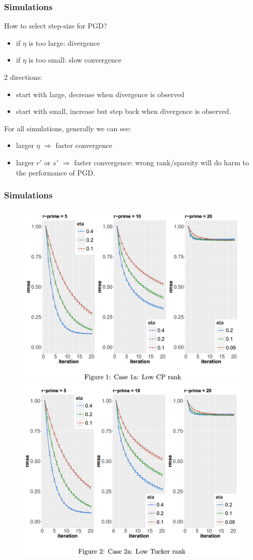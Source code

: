 \documentclass{beamer}
\begin{document}
	
	\begin{frame}
		\frametitle{Simulations}
		How to select step-size for PGD?
		\begin{itemize}
			\item 
			if $\eta$ is too large: divergence
			\item
			if $\eta$ is too small: slow convergence
		\end{itemize}
		2 directions:
		\begin{itemize}
			\item 
			start with large, decrease when divergence is observed
			\item
			start with small, increase but step back when divergence is observed.
		\end{itemize}
		
		For all simulations, generally we can see:
		\begin{itemize}
			\item 
			larger $\eta$ $\Rightarrow$ faster convergence
			\item
			larger $r'$ or $s'$ $\Rightarrow$ faster convergence: wrong rank/sparsity will do harm to the performance of PGD.
		\end{itemize}
	\end{frame}
	
	\begin{frame}
		\frametitle{Simulations}
		\begin{figure}
			\includegraphics[width=.45\linewidth]{image032.png}
			\includegraphics[width=.45\linewidth]{image033.png}
		\end{figure}
	\end{frame}
	
\end{document}
